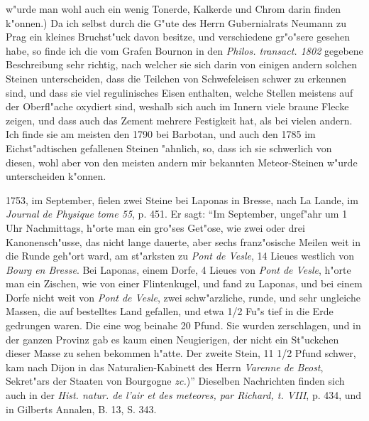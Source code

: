 \documentclass[a4paper, 11pt, oneside, polutonikogreek, german]{article}
\begin{document}
w"urde man wohl auch ein wenig Tonerde, Kalkerde und Chrom darin finden k"onnen.) Da ich selbst durch die G"ute des Herrn Gubernialrats Neumann zu Prag ein kleines Bruchst"uck davon besitze, und verschiedene gr"o"sere gesehen habe, so finde ich die vom Grafen Bournon in den \emph{Philos. transact. 1802} gegebene Beschreibung sehr richtig, nach welcher sie sich darin von einigen andern solchen Steinen unterscheiden, dass die Teilchen von Schwefeleisen schwer zu erkennen sind, und dass sie viel regulinisches Eisen enthalten, welche Stellen meistens auf der Oberfl"ache oxydiert sind, weshalb sich auch im Innern viele braune Flecke zeigen, und dass auch das Zement mehrere Festigkeit hat, als bei vielen andern. Ich finde sie am meisten den 1790 bei Barbotan, und auch den 1785 im Eichst"adtischen gefallenen Steinen "ahnlich, so, dass ich sie schwerlich von diesen, wohl aber von den meisten andern mir bekannten Meteor-Steinen w"urde unterscheiden k"onnen.

1753, im September, fielen zwei Steine bei Laponas in Bresse, nach La Lande, im \emph{Journal de Physique tome 55}, p. 451. Er sagt: "`Im September, ungef"ahr um 1 Uhr Nachmittags, h"orte man ein gro"ses Get"ose, wie zwei oder drei Kanonensch"usse, das nicht lange dauerte, aber sechs franz"osische Meilen weit in die Runde geh"ort ward, am st"arksten zu \emph{Pont de Vesle}, 14 Lieues westlich von \emph{Bourg en Bresse}. Bei Laponas, einem Dorfe, 4 Lieues von \emph{Pont de Vesle}, h"orte man ein Zischen, wie von einer Flintenkugel, und fand zu Laponas, und bei einem Dorfe nicht weit von \emph{Pont de Vesle}, zwei schw"arzliche, runde, und sehr ungleiche Massen, die auf bestelltes Land gefallen, und etwa 1/2 Fu"s tief in die Erde gedrungen waren. Die eine wog beinahe 20 Pfund. Sie wurden zerschlagen, und in der ganzen Provinz gab es kaum einen Neugierigen, der nicht ein St"uckchen dieser Masse zu sehen bekommen h"atte. Der zweite Stein, 11 1/2 Pfund schwer, kam nach Dijon in das Naturalien-Kabinett des Herrn \emph{Varenne de Beost}, Sekret"ars der Staaten von Bourgogne \emph{zc.})"' Dieselben Nachrichten finden sich auch in der \emph{Hist. natur. de l'air et des meteores, par Richard, t. VIII}, p. 434, und in Gilberts Annalen, B. 13, S. 343.
\end{document}
